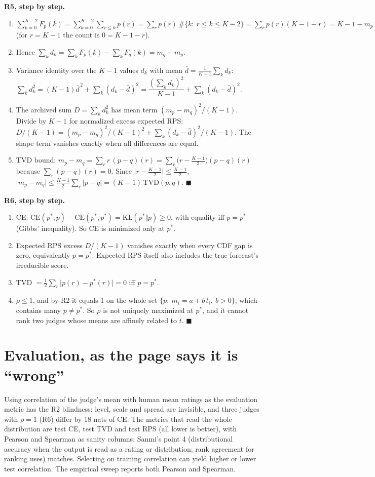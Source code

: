 \documentclass[11pt]{article}
\begin{document}
\textbf{R5, step by step.}
\begin{enumerate}\setlength{\itemsep}{1pt}
\item $\sum_{k=0}^{K-2}F_p(k)=\sum_{k=0}^{K-2}\sum_{r\le k}p(r)=\sum_r p(r)\,\#\{k:\ r\le k\le K-2\}=\sum_r p(r)(K-1-r)=K-1-m_p$ (for $r=K-1$ the count is $0=K-1-r$).
\item Hence $\sum_k d_k=\sum_kF_p(k)-\sum_kF_q(k)=m_q-m_p$.
\item Variance identity over the $K-1$ values $d_k$ with mean $\bar d=\frac{1}{K-1}\sum_kd_k$: $\sum_kd_k^2=(K-1)\bar d^{\,2}+\sum_k(d_k-\bar d)^2=\dfrac{(\sum_kd_k)^2}{K-1}+\sum_k(d_k-\bar d)^2$.
\item The archived sum $D=\sum_kd_k^2$ has mean term $(m_p-m_q)^2/(K-1)$. Divide by $K-1$ for normalized excess expected RPS: $D/(K-1)=(m_p-m_q)^2/(K-1)^2+\sum_k(d_k-\bar d)^2/(K-1)$. The shape term vanishes exactly when all differences are equal.
\item TVD bound: $m_p-m_q=\sum_r r\,(p-q)(r)=\sum_r\big(r-\tfrac{K-1}2\big)(p-q)(r)$ because $\sum_r(p-q)(r)=0$. Since $\lvert r-\tfrac{K-1}2\rvert\le\tfrac{K-1}2$, $\lvert m_p-m_q\rvert\le\tfrac{K-1}2\sum_r\lvert p-q\rvert=(K-1)\,\mathrm{TVD}(p,q)$. \hfill$\blacksquare$
\end{enumerate}

\textbf{R6, step by step.}
\begin{enumerate}\setlength{\itemsep}{1pt}
\item CE: $\mathrm{CE}(p^\ast,p)-\mathrm{CE}(p^\ast,p^\ast)=\mathrm{KL}(p^\ast\Vert p)\ge0$, with equality iff $p=p^\ast$ (Gibbs' inequality). So CE is minimized only at $p^\ast$.
\item Expected RPS excess $D/(K-1)$ vanishes exactly when every CDF gap is zero, equivalently $p=p^\ast$. Expected RPS itself also includes the true forecast’s irreducible score.
\item TVD $=\frac12\sum_r\lvert p(r)-p^\ast(r)\rvert=0$ iff $p=p^\ast$.
\item $\rho\le1$, and by R2 it equals 1 on the whole set $\{p:\ m_i=a+b\,t_i,\ b>0\}$, which contains many $p\ne p^\ast$. So $\rho$ is not uniquely maximized at $p^\ast$, and it cannot rank two judges whose means are affinely related to $t$. \hfill$\blacksquare$
\end{enumerate}

\section{Evaluation, as the page says it is ``wrong''}
Using correlation of the judge's mean with human mean ratings as the evaluation metric has the R2 blindness: level, scale and spread are invisible, and three judges with $\rho=1$ (R6) differ by 18 nats of CE. The metrics that read the whole distribution are test CE, test TVD and test RPS (all lower is better), with Pearson and Spearman as sanity columns; Sanmi's point 4 (distributional accuracy when the output is read as a rating or distribution; rank agreement for ranking uses) matches. Selecting on training correlation can yield higher or lower test correlation. The empirical sweep reports both Pearson and Spearman.
\end{document}
